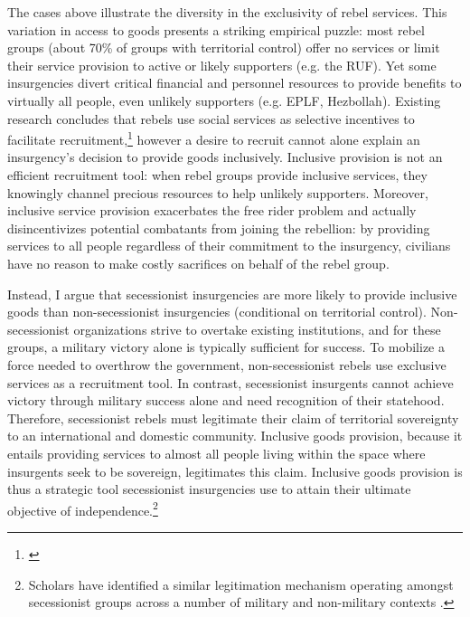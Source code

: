 \documentclass[12pt, letterpaper]{article}
\begin{document}
The cases above illustrate the diversity in the exclusivity of rebel services. This variation in access to goods presents a striking empirical puzzle: most rebel groups (about 70\% of groups with territorial control) offer no services or limit their service provision to active or likely supporters (e.g. the RUF). Yet some insurgencies divert critical financial and personnel resources to provide benefits to virtually all people, even unlikely supporters (e.g. EPLF, Hezbollah). Existing research concludes that rebels use social services as selective incentives to facilitate recruitment,\footnote{\citealt{weinstein2006inside, berman2008religion}} however a desire to recruit cannot alone explain an insurgency's decision to provide goods inclusively. Inclusive provision is not an efficient recruitment tool: when rebel groups provide inclusive services, they knowingly channel precious resources to help unlikely supporters. Moreover, inclusive service provision exacerbates the free rider problem and actually disincentivizes potential combatants from joining the rebellion: by providing services to all people regardless of their commitment to the insurgency, civilians have no reason to make costly sacrifices on behalf of the rebel group.

Instead, I argue that secessionist insurgencies are more likely to provide inclusive goods than non-secessionist insurgencies (conditional on territorial control). Non-secessionist organizations strive to overtake existing institutions, and for these groups, a military victory alone is typically sufficient for success. To mobilize a force needed to overthrow the government, non-secessionist rebels use exclusive services as a recruitment tool. In contrast, secessionist insurgents cannot achieve victory through military success alone and need recognition of their statehood. Therefore, secessionist rebels must legitimate their claim of territorial sovereignty to an international and domestic community. Inclusive goods provision, because it entails providing services to almost all people living within the space where insurgents seek to be sovereign, legitimates this claim. Inclusive goods provision is thus a strategic tool secessionist insurgencies use to attain their ultimate objective of independence.\footnote{Scholars have identified a similar legitimation mechanism operating amongst secessionist groups across a number of military and non-military contexts \citep{fazal2013secessionism,lasley2014secession,jo2015compliant}.} 
\end{document}
